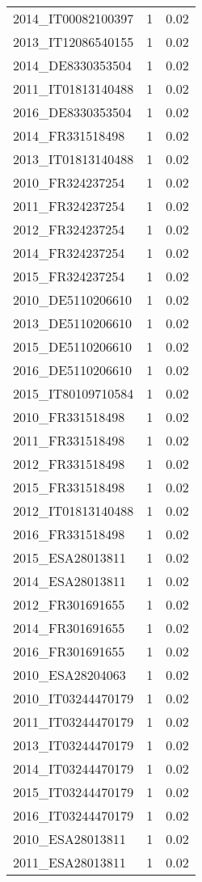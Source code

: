 \begin{table*}[htbp]
\begin{tabular}{lrr}
2014_IT00082100397 & 1 & 0.02 \\
2013_IT12086540155 & 1 & 0.02 \\
2014_DE8330353504 & 1 & 0.02 \\
2011_IT01813140488 & 1 & 0.02 \\
2016_DE8330353504 & 1 & 0.02 \\
2014_FR331518498 & 1 & 0.02 \\
2013_IT01813140488 & 1 & 0.02 \\
2010_FR324237254 & 1 & 0.02 \\
2011_FR324237254 & 1 & 0.02 \\
2012_FR324237254 & 1 & 0.02 \\
2014_FR324237254 & 1 & 0.02 \\
2015_FR324237254 & 1 & 0.02 \\
2010_DE5110206610 & 1 & 0.02 \\
2013_DE5110206610 & 1 & 0.02 \\
2015_DE5110206610 & 1 & 0.02 \\
2016_DE5110206610 & 1 & 0.02 \\
2015_IT80109710584 & 1 & 0.02 \\
2010_FR331518498 & 1 & 0.02 \\
2011_FR331518498 & 1 & 0.02 \\
2012_FR331518498 & 1 & 0.02 \\
2015_FR331518498 & 1 & 0.02 \\
2012_IT01813140488 & 1 & 0.02 \\
2016_FR331518498 & 1 & 0.02 \\
2015_ESA28013811 & 1 & 0.02 \\
2014_ESA28013811 & 1 & 0.02 \\
2012_FR301691655 & 1 & 0.02 \\
2014_FR301691655 & 1 & 0.02 \\
2016_FR301691655 & 1 & 0.02 \\
2010_ESA28204063 & 1 & 0.02 \\
2010_IT03244470179 & 1 & 0.02 \\
2011_IT03244470179 & 1 & 0.02 \\
2013_IT03244470179 & 1 & 0.02 \\
2014_IT03244470179 & 1 & 0.02 \\
2015_IT03244470179 & 1 & 0.02 \\
2016_IT03244470179 & 1 & 0.02 \\
2010_ESA28013811 & 1 & 0.02 \\
2011_ESA28013811 & 1 & 0.02 \\

\end{tabular}
\end{table*}
